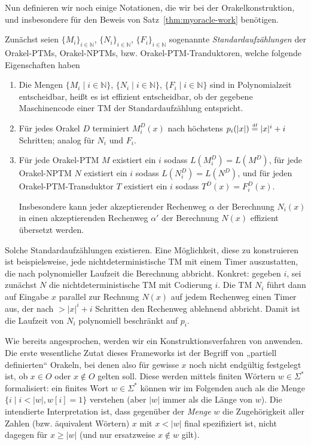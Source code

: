 Nun definieren wir noch einige Notationen, die wir bei der Orakelkonstruktion, und insbesondere für den Beweis von Satz~\ref{thm:myoracle-work} benötigen.

Zunächst seien $\{M_i\}_{i\in \mathbb N}$, $\{N_i\}_{i\in \mathbb N}$, $\{F_i\}_{i\in\mathbb N}$ sogenannte \emph{Standardaufzählungen} der Orakel-PTMs, Orakel-NPTMs, bzw. Orakel-PTM-Tranduktoren, welche folgende Eigenschaften haben
\begin{enumerate}[label=\arabic*.,nosep]
    \item Die Mengen $\{M_i \mid i\in\mathbb N\}$, $\{N_i \mid i\in\mathbb N\}$, $\{F_i \mid i\in\mathbb N\}$ sind in Polynomialzeit entscheidbar, heißt es ist effizient entscheidbar, ob der gegebene Maschinencode einer TM der Standardaufzählung entspricht.
    \item Für jedes Orakel $D$ terminiert $M_i^D(x)$ nach höchstens $p_i(|x|)\stackrel{\text{\smash{\tiny df}}}{=} |x|^i+i$ Schritten; analog für $N_i$ und $F_i$.
    \item Für jede Orakel-PTM $M$ existiert ein $i$ sodass $L(M^D_i)=L(M^D)$, 
        für jede Orakel-NPTM $N$ existiert ein $i$ sodass $L(N^D_i)=L(N^D)$, und
        für jeden Orakel-PTM-Transduktor $T$ existiert ein $i$ sodass $T^D(x)=F_i^D(x)$.

        Insbesondere kann jeder akzeptierender Rechenweg $\alpha$ der Berechnung $N_i(x)$ in einen akzeptierenden Rechenweg $\alpha'$ der Berechnung $N(x)$ effizient übersetzt werden.
\end{enumerate}
Solche Standardaufzählungen existieren. Eine Möglichkeit, diese zu konstruieren ist beispielsweise, jede nichtdeterministische TM mit einem Timer auszustatten, die nach polynomieller Laufzeit die Berechnung abbricht. Konkret: gegeben $i$, sei zunächst $N$ die nichtdeterministische TM mit Codierung $i$. Die TM $N_i$ führt dann auf Eingabe $x$ parallel zur Rechnung $N(x)$ auf jedem Rechenweg einen Timer aus, der nach $>|x|^i+i$ Schritten den Rechenweg ablehnend abbricht.
Damit ist die Laufzeit von $N_i$ polynomiell beschränkt auf $p_i$.

Wie bereits angesprochen, werden wir ein Konstruktionsverfahren von \citeauthor{dose_np-completeness_2019} anwenden. Die erste wesentliche Zutat dieses Frameworks ist der Begriff von „partiell definierten“ Orakeln, bei denen also für gewisse $x$ noch nicht endgültig festgelegt ist, ob $x\in O$ oder $x\not\in O$ gelten soll.
Diese werden mittels finiten Wörtern $w\in\Sigma^*$ formalisiert:
ein finites Wort $w\in\Sigma^*$ können wir im Folgenden auch als die Menge $\{ i \mid i<|w|, w[i] = 1 \}$ verstehen (aber $|w|$ immer als die Länge von $w$).
Die intendierte Interpretation ist, dass gegenüber der \emph{Menge} $w$ die Zugehörigkeit aller Zahlen (bzw. äquivalent Wörtern) $x$ mit $x<|w|$ final spezifiziert ist, nicht dagegen für $x\geq|w|$ (und nur ersatzweise $x\not\in w$ gilt).

